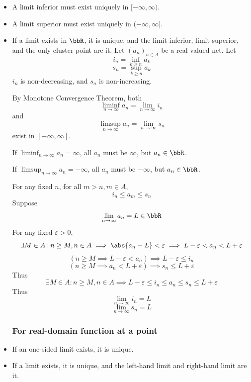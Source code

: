 \documentclass[a4paper,12pt]{report}
\begin{document}
\begin{itemize}
\begin{itemize}
\section{Limit Theorems and Methods}
\subsection{Uniqueness and Existence}
\subsubsection{For real series}
If a limit exists, it is unique.
\subsubsection{For real-valued net}
\bit
\item A limit inferior must exist uniquely in $[-\infty,\infty)$.
\item A limit superior must exist uniquely in $(-\infty,\infty]$.
\item If a limit exists in $\bbR$, it is unique, and the limit inferior, limit superior, and the only cluster point are it.
\eit
\bpr
Let $(a_n)_{n\in A}$ be a real-valued net. Let
\[i_n=\inf_{k\ge n}a_k\]
\[s_n=\sup_{k\ge n}a_k\]
$i_n$ is non-decreasing, and $s_n$ is non-increasing. 

By Monotone Convergence Theorem, both
\[\liminf_{n\to\infty}a_n=\lim_{n\to\infty}i_n\]
and
\[\limsup_{n\to\infty}a_n=\lim_{n\to\infty}s_n\]
exist in $[-\infty,\infty]$.

If $\liminf_{n\to\infty}a_n=\infty$, all $a_n$ must be $\infty$, but $a_n\in\bbR$.

If $\limsup_{n\to\infty}a_n=-\infty$, all $a_n$ must be $-\infty$, but $a_n\in\bbR$.

For any fixed $n$, for all $m>n,m\in A$,
\[i_n\le a_m\le s_n\]
Suppose
\[\lim_{n \to \infty} a_n = L\in\bbR\]
For any fixed $\varepsilon>0$,
\[\exists M\in A\colon n\ge M, n\in A\implies\abs{a_n-L}<\varepsilon\implies L-\varepsilon<a_n<L+\varepsilon\]
\[(n\ge M\implies L-\varepsilon<a_n)\implies L-\varepsilon\le i_n\]
\[(n\ge M\implies a_n<L+\varepsilon)\implies s_n\le L+\varepsilon\]
Thus
\[\exists M\in A\colon n\ge M, n\in A\implies L-\varepsilon\le i_n\le a_n\le s_n\le L+\varepsilon\]
Thus
\[\lim_{n \to \infty} i_n = L\]
\[\lim_{n \to \infty} s_n = L\]
\epr
\subsubsection{For real-domain function at a point}
\bit
\item If an one-sided limit exists, it is unique.
\item If a limit exists, it is unique, and the left-hand limit and right-hand limit are it.
\eit

\end{itemize}
\end{itemize}
\end{document}
